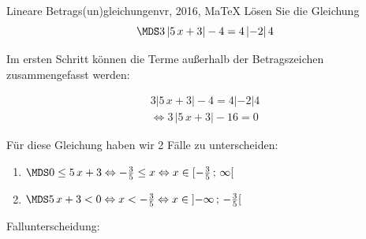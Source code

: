  \providecommand{\MoIl}[1][]{\mbox{}#1]\mathopen{}} 
 \providecommand{\MoIr}[1][]{#1[\mbox{}} 
 \providecommand{\MIntvlSep}{;} 
 \providecommand{\MElSetSep}{\, ; \, } 
 \begin{MAufgabe}{Lineare Betrags(un)gleichungen}{vr, 2016, MaTeX}
L\"osen Sie die Gleichung
$$
 \MDS 3\left| 5\, x + 3 \right|-4= 4 \left| -2 \right| 4
$$  

\ifLsg\MLoesung

Im ersten Schritt k\"onnen die Terme au\ss{}erhalb der Betragszeichen zusammengefasst werden:

\begin{align*} 
 3\left| 5\, x + 3 \right|-4= 4 \left| -2 \right| 4\\ 
\Leftrightarrow3\, \left|5\, x + 3\right| - 16= 0 
 \end{align*}

F\"ur diese Gleichung haben wir 2 F\"alle zu unterscheiden: 
\begin{enumerate}
\item $ \MDS 
0 \leq 5\, x + 3
\Leftrightarrow - \frac{3}{5} \leq x\Leftrightarrow x \in [ - \frac{3}{5} \, \MIntvlSep \, \infty\MoIr $ 
\item $ \MDS 
5\, x + 3 < 0
\Leftrightarrow x < - \frac{3}{5}\Leftrightarrow x \in \MoIl  -\infty \, \MIntvlSep \, - \frac{3}{5}\MoIr $ 
\end{enumerate} 
Fallunterscheidung: 


\end{MAufgabe}
